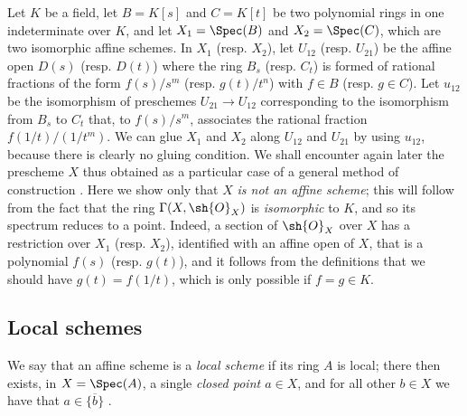 \begin{example}[2.3.2]
\label{I.2.3.2}
Let $K$ be a field, let $B=K[s]$ and $C=K[t]$ be two polynomial rings in one indeterminate over $K$, and let $X_1=\Spec(B)$ and $X_2=\Spec(C)$, which are two isomorphic affine schemes.
In $X_1$ (resp. $X_2$), let $U_{12}$ (resp. $U_{21}$) be the affine open $D(s)$ (resp. $D(t)$) where the ring $B_s$ (resp. $C_t$) is formed of rational fractions of the form $f(s)/s^m$ (resp. $g(t)/t^n$) with $f\in B$ (resp. $g\in C$).
Let $u_{12}$ be the isomorphism of preschemes $U_{21}\to U_{12}$ corresponding  to the isomorphism from $B_s$ to $C_t$ that, to $f(s)/s^m$, associates the rational fraction $f(1/t)/(1/t^m)$.
We can glue $X_1$ and $X_2$ along $U_{12}$ and $U_{21}$ by using $u_{12}$, because there is clearly no gluing condition.
We shall encounter again later the prescheme $X$ thus obtained as a particular case of a general method of construction .
Here we show only that $X$ \emph{is not an affine scheme};
this will follow from the fact that the ring $\Gamma(X,\sh{O}_X)$ is \emph{isomorphic} to $K$, and so its spectrum reduces to a point.
Indeed, a section of $\sh{O}_X$ over $X$ has a restriction over $X_1$ (resp. $X_2$), identified with an affine open of $X$, that is a polynomial $f(s)$ (resp. $g(t)$), and it follows from the definitions that we should have $g(t)=f(1/t)$, which is only possible if $f=g\in K$.
\end{example}

\subsection{Local schemes}
\label{subsection:I.2.4}

\begin{env}[2.4.1]
\label{I.2.4.1}
We say that an affine scheme is a \emph{local scheme} if its ring $A$ is local;
there then exists, in $X=\Spec(A)$, a single \emph{closed point $a\in X$}, and for all other $b\in X$ we have that $a\in\overline{\{b\}}$ .
\end{env}

